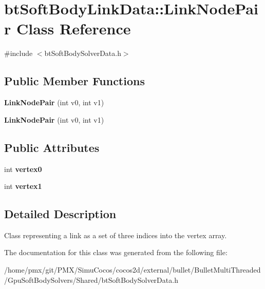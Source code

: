 \hypertarget{classbtSoftBodyLinkData_1_1LinkNodePair}{}\section{bt\+Soft\+Body\+Link\+Data\+:\+:Link\+Node\+Pair Class Reference}
\label{classbtSoftBodyLinkData_1_1LinkNodePair}


{\ttfamily \#include $<$bt\+Soft\+Body\+Solver\+Data.\+h$>$}

\subsection*{Public Member Functions}
\begin{DoxyCompactItemize}
\item 
\mbox{\label{classbtSoftBodyLinkData_1_1LinkNodePair_a444221c0b4b243d75127162ed0c38b41}} 
{\bfseries Link\+Node\+Pair} (int v0, int v1)
\item 
\mbox{\label{classbtSoftBodyLinkData_1_1LinkNodePair_a444221c0b4b243d75127162ed0c38b41}} 
{\bfseries Link\+Node\+Pair} (int v0, int v1)
\end{DoxyCompactItemize}
\subsection*{Public Attributes}
\begin{DoxyCompactItemize}
\item 
\mbox{\label{classbtSoftBodyLinkData_1_1LinkNodePair_a3e0c3b59017f78785112335bf7f4eee6}} 
int {\bfseries vertex0}
\item 
\mbox{\label{classbtSoftBodyLinkData_1_1LinkNodePair_a5d7726c44af214bc51b7a168e5888f6b}} 
int {\bfseries vertex1}
\end{DoxyCompactItemize}


\subsection{Detailed Description}
Class representing a link as a set of three indices into the vertex array. 

The documentation for this class was generated from the following file\+:\begin{DoxyCompactItemize}
\item 
/home/pmx/git/\+P\+M\+X/\+Simu\+Cocos/cocos2d/external/bullet/\+Bullet\+Multi\+Threaded/\+Gpu\+Soft\+Body\+Solvers/\+Shared/bt\+Soft\+Body\+Solver\+Data.\+h\end{DoxyCompactItemize}
